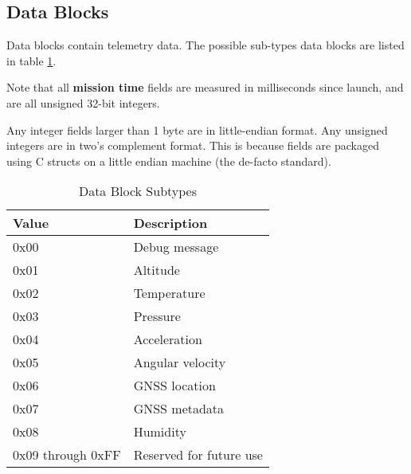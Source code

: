 \subsection{Data Blocks}

Data blocks contain telemetry data. The possible sub-types data blocks are listed in table \ref{table:data-subtypes}.

Note that all \textbf{mission time} fields are measured in milliseconds since launch, and are all unsigned 32-bit
integers.

Any integer fields larger than 1 byte are in little-endian format. Any unsigned integers are in two's complement format.
This is because fields are packaged using C structs on a little endian machine (the de-facto standard).

\begin{table}[H]
    \centering
    \begin{tabular}{@{}ll@{}}
        \toprule
        Value             & Description             \\
        \midrule
        0x00              & Debug message           \\
        0x01              & Altitude                \\
        0x02              & Temperature             \\
        0x03              & Pressure                \\
        0x04              & Acceleration            \\
        0x05              & Angular velocity        \\
        0x06              & GNSS location           \\
        0x07              & GNSS metadata           \\
        0x08              & Humidity                \\
        0x09 through 0xFF & Reserved for future use \\
        \bottomrule
    \end{tabular}
    \caption{Data Block Subtypes}
    \label{table:data-subtypes}
\end{table}










